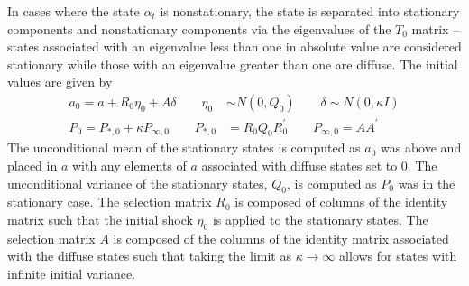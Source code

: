 \documentclass[12pt]{article}
\begin{document}
	In cases where the state $\alpha_t$ is nonstationary, the state is separated into stationary components and nonstationary components via the eigenvalues of the $T_0$ matrix -- states associated with an eigenvalue less than one in absolute value are considered stationary while those with an eigenvalue greater than one are diffuse. The initial values are given by 
	\begin{align*}
	a_0 = a + R_0 \eta_0 + A \delta \qquad \eta_0 &\sim N(0, Q_0) \qquad \delta \sim N(0, \kappa I) \\
	P_0 = P_{*,0} + \kappa P_{\infty,0} \qquad P_{*,0} &= R_0 Q_0 R_0^\prime \qquad P_{\infty,0} = A A^\prime
	\end{align*}
	The unconditional mean of the stationary states is computed as $a_0$ was above and placed in $a$ with any elements of $a$ associated with diffuse states set to 0. The unconditional variance of the stationary states, $Q_0$, is computed as $P_0$ was in the stationary case. The selection matrix $R_0$ is composed of columns of the identity matrix such that the initial shock $\eta_0$ is applied to the stationary states. The selection matrix $A$ is composed of the columns of the identity matrix associated with the diffuse states such that taking the limit as $\kappa \rightarrow \infty$ allows for states with infinite initial variance. \\
\end{document}
